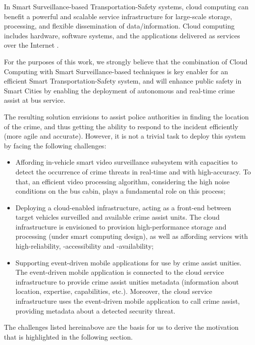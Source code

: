 In Smart Surveillance-based Transportation-Safety systems, cloud computing can benefit a powerful and scalable service infrastructure for large-scale storage, processing, and flexible dissemination of data/information. Cloud computing includes hardware, software systems, and the applications delivered as services over the Internet \cite{Xinhui2009}.

For the purposes of this work, we strongly believe that the combination of Cloud Computing with Smart Surveillance-based techniques is key enabler for an efficient Smart Transportation-Safety system, and will enhance public safety in Smart Cities by enabling the deployment of autonomous and real-time crime assist at bus service.

The resulting solution envisions to assist police authorities in finding the location of the crime, and thus getting the ability to respond to the incident efficiently (more agile and accurate). However, it is not a trivial task to deploy this system by facing the following challenges:

\begin{itemize}
\item Affording in-vehicle smart video surveillance subsystem with capacities to detect the occurrence of crime threats in real-time and with high-accuracy. To that, an efficient video processing algorithm, considering the high noise conditions on the bus cabin, plays a fundamental role on this process;

\item Deploying a cloud-enabled infrastructure, acting as a front-end between target vehicles surveilled and available crime assist units. The cloud infrastructure is envisioned to provision high-performance storage and processing (under smart computing design), as well as affording services with high-reliability, -accessibility and -availability;

\item Supporting event-driven mobile applications for use by crime assist unities. The event-driven mobile application is connected to the cloud service infrastructure to provide crime assist unities metadata (information about location, expertise, capabilities, etc.). Moreover, the cloud service infrastructure uses the event-driven mobile application to call crime assist, providing metadata about a detected security threat.

\end{itemize}

The challenges listed hereinabove are the basis for us to derive the motivation that is highlighted in the following section.

